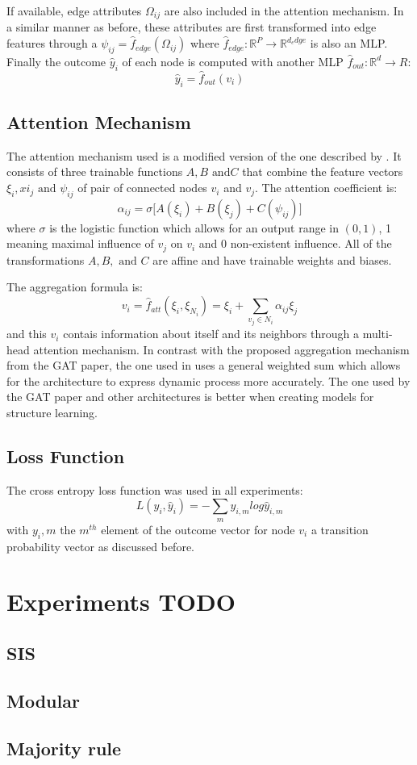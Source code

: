 If available, edge attributes $\Omega_{ij}$ are also included in the attention
mechanism. In a similar manner as before, these attributes are first transformed
into edge features through a $\psi_{ij} = \hat{f}_{edge} (\Omega_{ij})$ where
$\hat{f}_{edge}: \mathbb{R}^P \rightarrow \mathbb{R}^{d_edge}$ is also an MLP.
Finally the outcome $\hat{y}_i$ of each node is computed with another MLP $\hat{f}_{out}: \mathbb{R}^d \rightarrow R$:
\begin{equation}
  \label{eq:final_out}
  \hat{y}_i = \hat{f}_{out}(v_i)
\end{equation}

\subsection{Attention Mechanism}
The attention mechanism used is a modified version of the one described by
\citet{velickovic2017graph}. It consists of three trainable functions
$A, B \text{ and} C$ that combine the feature vectors $\xi_i, xi_j \text{ and } \psi_{ij}$ of
pair of connected nodes $v_i$ and $v_j$. The attention coefficient is:
\begin{equation}
  \label{eq:att_coeff}
  \alpha_{ij} = \sigma \big[ A(\xi_i) + B(\xi_j) + C(\psi_{ij}) \big]
\end{equation}
where $\sigma$ is the logistic function which allows for an output range
in $(0, 1)$, 1 meaning maximal influence of $v_j$ on $v_i$ and 0 non-existent influence.
All of the transformations $A, B, \text{ and } C$ are affine and have trainable weights
and biases. 

The aggregation formula is:
\begin{equation}
  \label{eq:att_aggr}
  v_i = \hat{f}_{att}(\xi_i, \xi_{N_i}) = \xi_i + \sum_{v_j \in N_i} \alpha_{ij} \xi_j
\end{equation}
and this $v_i$ contais information about itself and its neighbors through a
multi-head attention mechanism. In contrast with the proposed aggregation mechanism
from the GAT paper, the one used in  uses a general weighted sum
which allows for the architecture to express dynamic process more accurately. The one
used by the GAT paper and other architectures is better when creating models for structure
learning. 

\subsection{Loss Function}
The cross entropy loss function was used in all experiments:
\begin{equation}
  \label{eq:cross_loss}
  L(y_i, \hat{y}_i) = - \sum_m y_{i,m} log \hat{y}_{i,m}
\end{equation}
with $y_i,m$ the $m^{th}$ element of the outcome vector for node $v_i$ a transition
probability vector as discussed before. 
\section{Experiments TODO}
\subsection{SIS}
\subsection{Modular}
\subsection{Majority rule}